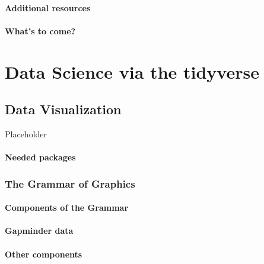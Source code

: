 \documentclass[12pt, krantz2,]{krantz}
\begin{document}
\hypertarget{additional-resources}{%
\subsection{Additional resources}\label{additional-resources}}

\hypertarget{whats-to-come}{%
\subsection{What's to come?}\label{whats-to-come}}

\hypertarget{part-data-science-via-the-tidyverse}{%
\part{Data Science via the tidyverse}\label{part-data-science-via-the-tidyverse}}

\hypertarget{viz}{%
\chapter{Data Visualization}\label{viz}}

Placeholder

\hypertarget{needed-packages}{%
\subsection*{Needed packages}\label{needed-packages}}


\hypertarget{grammarofgraphics}{%
\section{The Grammar of Graphics}\label{grammarofgraphics}}

\hypertarget{components-of-the-grammar}{%
\subsection{Components of the Grammar}\label{components-of-the-grammar}}

\hypertarget{gapminder}{%
\subsection{Gapminder data}\label{gapminder}}

\hypertarget{other-components}{%
\subsection{Other components}\label{other-components}}
\end{document}
